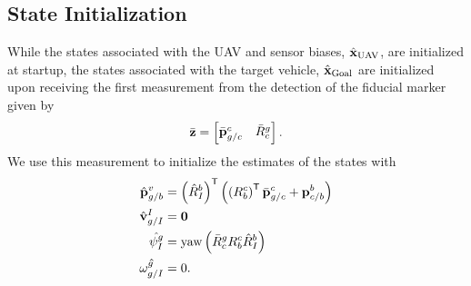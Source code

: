 
\subsection{State Initialization}

While the states associated with the UAV and sensor biases,
$\hat{\boldsymbol{\mathrm{x}}}_{\text{UAV}}$, are initialized at startup,
the states associated with the target vehicle, $\hat{\boldsymbol{\mathrm{x}}}_{\text{Goal}}$ are
initialized upon receiving the first measurement from
the detection of the fiducial marker given by
\begin{equation}
  \bar{\vect{z}} =
  \begin{bmatrix}
    \bar{\vect{p}}_{g/c}^c & \bar{R}_c^g
  \end{bmatrix}.
  \label{eq:fiducial_meas}
\end{equation}
We use this measurement to initialize the estimates of the states with
\begin{align}
  \hat{\boldsymbol{\mathrm{p}}}_{g/b}^v &= \left( \hat{R}_I^b \right)^{\mathsf{T}} \left( \left ( R_b^c
  \right)^{\mathsf{T}} \bar{\boldsymbol{\mathrm{p}}}_{g/c}^c + \boldsymbol{\mathrm{p}}_{c/b}^b
\right)   \\
      \hat{\boldsymbol{\mathrm{v}}}_{g/I}^I &= \boldsymbol{\mathrm{0}} \\
      \hat{\psi_I^g} &= \text{yaw} \left( \bar{R}_c^g R_b^c \hat{R}_I^b \right)
      \\
      \hat{\omega_{g/I}^g} &= 0.
\end{align}



